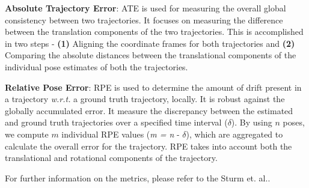 \textbf{Absolute Trajectory Error}: 
ATE is used for measuring the overall global consistency between two trajectories. It focuses on measuring the difference between the translation components of the two trajectories. This is accomplished in two steps - \textbf{(1)} Aligning the coordinate frames for both trajectories \cite{horn1987closed} and \textbf{(2)} Comparing the absolute distances between the translational components of the individual pose estimates of both the trajectories. 


\textbf{Relative Pose Error}: 
RPE is used to determine the amount of drift present in a trajectory \textit{w.r.t.} a ground truth trajectory, locally. It is robust against the globally accumulated error. It measure the discrepancy between the estimated and ground truth trajectories over a specified time interval ($\delta$).  By using $n$ poses, we compute $m$ individual RPE values (\textit{m = n }- $\delta$), which are aggregated to calculate the overall error for the trajectory. RPE takes into account both the translational and rotational components of the trajectory.

For further information on the metrics, please refer to the Sturm et. al.\cite{sturm2012benchmark}.